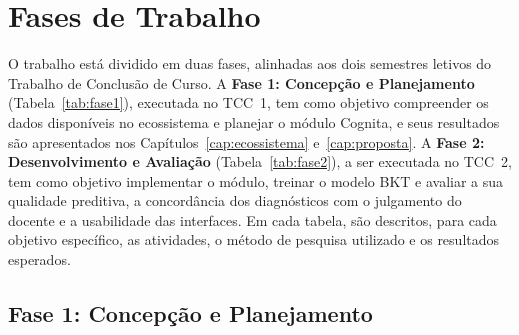 \section{Fases de Trabalho}
\label{sec:fases-trabalho}

O trabalho está dividido em duas fases, alinhadas aos dois semestres letivos do Trabalho de Conclusão de Curso. A \textbf{Fase 1: Concepção e Planejamento} (Tabela~\ref{tab:fase1}), executada no TCC~1, tem como objetivo compreender os dados disponíveis no ecossistema e planejar o módulo Cognita, e seus resultados são apresentados nos Capítulos~\ref{cap:ecossistema} e~\ref{cap:proposta}. A \textbf{Fase 2: Desenvolvimento e Avaliação} (Tabela~\ref{tab:fase2}), a ser executada no TCC~2, tem como objetivo implementar o módulo, treinar o modelo BKT e avaliar a sua qualidade preditiva, a concordância dos diagnósticos com o julgamento do docente e a usabilidade das interfaces. Em cada tabela, são descritos, para cada objetivo específico, as atividades, o método de pesquisa utilizado e os resultados esperados.

\subsection{Fase 1: Concepção e Planejamento}
\label{subsec:fase1}

